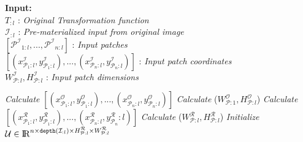 \begin{algorithm}[t]
    \caption{}
    \label{alg:incinference}
    \begin{flushleft}
     \hspace*{1mm} \textbf{Input:} \\
     \hspace*{3mm} $T_{:l}$ : \textit{Original Transformation function}\\
     \hspace*{3mm} $\mathcal{I}_{:l}$ : \textit{Pre-materialized input from original image}\\
     \hspace*{3mm} $[\mathcal{P^I}_{1:l},...,\mathcal{P^I}_{n:l}]$ : \textit{Input patches}\\
     \hspace*{3mm} $[(x^\mathcal{I}_{\mathcal{P}_1:l},y^\mathcal{I}_{\mathcal{P}_1:l}),...,(x^\mathcal{I}_{\mathcal{P}_n:l},y^\mathcal{I}_{\mathcal{P}_n:l})]$ : \textit{Input patch coordinates}\\
     \hspace*{3mm} $W^\mathcal{I}_{\mathcal{P}:l},H^\mathcal{I}_{\mathcal{P}:l}$ : \textit{Input patch dimensions}
    \end{flushleft}


    \begin{algorithmic}[1]
    \State \textit{Calculate} $[(x^\mathcal{O}_{\mathcal{P}_1:l},y^\mathcal{O}_{\mathcal{P}_1:l}),...,(x^\mathcal{O}_{\mathcal{P}_n:l},y^\mathcal{O}_{\mathcal{P}_n:l})]$ 
    \State \textit{Calculate} ($W^\mathcal{O}_{\mathcal{P}:1},H^\mathcal{O}_{\mathcal{P}:l}$)
    \State \textit{Calculate} $[(x^\mathcal{R}_{\mathcal{P}_1:l},y^\mathcal{R}_{\mathcal{P}_1:l}),...,(x^\mathcal{R}_{\mathcal{P}_n:l},y^\mathcal{R}_{\mathcal{P}_n}:l)]$
    \State \textit{Calculate} ($W^\mathcal{R}_{\mathcal{P}:l},H^\mathcal{R}_{\mathcal{P}:l}$)
    \State \textit{Initialize} $\mathcal{U} \in \mathcal{\rm I\!R}^{n \times \texttt{depth}(\mathcal{I}_{:l}) \times H^\mathcal{R}_{\mathcal{P}:l} \times W^\mathcal{R}_{\mathcal{P}:l}}$


\end{algorithmic}
\end{algorithm}
